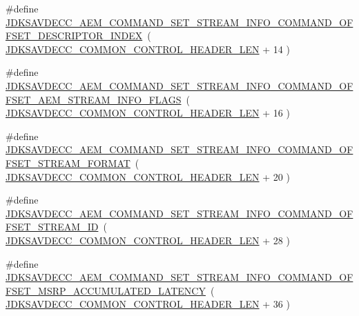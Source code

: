 \begin{DoxyCompactItemize}
\item 
\#define \hyperlink{group__command__set__stream__info_gae2c8f8975d9cf1cb27376158fdd5768f}{J\+D\+K\+S\+A\+V\+D\+E\+C\+C\+\_\+\+A\+E\+M\+\_\+\+C\+O\+M\+M\+A\+N\+D\+\_\+\+S\+E\+T\+\_\+\+S\+T\+R\+E\+A\+M\+\_\+\+I\+N\+F\+O\+\_\+\+C\+O\+M\+M\+A\+N\+D\+\_\+\+O\+F\+F\+S\+E\+T\+\_\+\+D\+E\+S\+C\+R\+I\+P\+T\+O\+R\+\_\+\+I\+N\+D\+EX}~( \hyperlink{group__jdksavdecc__avtp__common__control__header_gaae84052886fb1bb42f3bc5f85b741dff}{J\+D\+K\+S\+A\+V\+D\+E\+C\+C\+\_\+\+C\+O\+M\+M\+O\+N\+\_\+\+C\+O\+N\+T\+R\+O\+L\+\_\+\+H\+E\+A\+D\+E\+R\+\_\+\+L\+EN} + 14 )
\item 
\#define \hyperlink{group__command__set__stream__info_gaef8a0573e8b5fe63b636e92f219d763d}{J\+D\+K\+S\+A\+V\+D\+E\+C\+C\+\_\+\+A\+E\+M\+\_\+\+C\+O\+M\+M\+A\+N\+D\+\_\+\+S\+E\+T\+\_\+\+S\+T\+R\+E\+A\+M\+\_\+\+I\+N\+F\+O\+\_\+\+C\+O\+M\+M\+A\+N\+D\+\_\+\+O\+F\+F\+S\+E\+T\+\_\+\+A\+E\+M\+\_\+\+S\+T\+R\+E\+A\+M\+\_\+\+I\+N\+F\+O\+\_\+\+F\+L\+A\+GS}~( \hyperlink{group__jdksavdecc__avtp__common__control__header_gaae84052886fb1bb42f3bc5f85b741dff}{J\+D\+K\+S\+A\+V\+D\+E\+C\+C\+\_\+\+C\+O\+M\+M\+O\+N\+\_\+\+C\+O\+N\+T\+R\+O\+L\+\_\+\+H\+E\+A\+D\+E\+R\+\_\+\+L\+EN} + 16 )
\item 
\#define \hyperlink{group__command__set__stream__info_gad1e39931a6700da6d1227bcfba9583b1}{J\+D\+K\+S\+A\+V\+D\+E\+C\+C\+\_\+\+A\+E\+M\+\_\+\+C\+O\+M\+M\+A\+N\+D\+\_\+\+S\+E\+T\+\_\+\+S\+T\+R\+E\+A\+M\+\_\+\+I\+N\+F\+O\+\_\+\+C\+O\+M\+M\+A\+N\+D\+\_\+\+O\+F\+F\+S\+E\+T\+\_\+\+S\+T\+R\+E\+A\+M\+\_\+\+F\+O\+R\+M\+AT}~( \hyperlink{group__jdksavdecc__avtp__common__control__header_gaae84052886fb1bb42f3bc5f85b741dff}{J\+D\+K\+S\+A\+V\+D\+E\+C\+C\+\_\+\+C\+O\+M\+M\+O\+N\+\_\+\+C\+O\+N\+T\+R\+O\+L\+\_\+\+H\+E\+A\+D\+E\+R\+\_\+\+L\+EN} + 20 )
\item 
\#define \hyperlink{group__command__set__stream__info_ga25392dac748e3b4de8159c6cd33ecf7a}{J\+D\+K\+S\+A\+V\+D\+E\+C\+C\+\_\+\+A\+E\+M\+\_\+\+C\+O\+M\+M\+A\+N\+D\+\_\+\+S\+E\+T\+\_\+\+S\+T\+R\+E\+A\+M\+\_\+\+I\+N\+F\+O\+\_\+\+C\+O\+M\+M\+A\+N\+D\+\_\+\+O\+F\+F\+S\+E\+T\+\_\+\+S\+T\+R\+E\+A\+M\+\_\+\+ID}~( \hyperlink{group__jdksavdecc__avtp__common__control__header_gaae84052886fb1bb42f3bc5f85b741dff}{J\+D\+K\+S\+A\+V\+D\+E\+C\+C\+\_\+\+C\+O\+M\+M\+O\+N\+\_\+\+C\+O\+N\+T\+R\+O\+L\+\_\+\+H\+E\+A\+D\+E\+R\+\_\+\+L\+EN} + 28 )
\item 
\#define \hyperlink{group__command__set__stream__info_ga6f2760499997fcb1f9e9eb3eaa17dfe5}{J\+D\+K\+S\+A\+V\+D\+E\+C\+C\+\_\+\+A\+E\+M\+\_\+\+C\+O\+M\+M\+A\+N\+D\+\_\+\+S\+E\+T\+\_\+\+S\+T\+R\+E\+A\+M\+\_\+\+I\+N\+F\+O\+\_\+\+C\+O\+M\+M\+A\+N\+D\+\_\+\+O\+F\+F\+S\+E\+T\+\_\+\+M\+S\+R\+P\+\_\+\+A\+C\+C\+U\+M\+U\+L\+A\+T\+E\+D\+\_\+\+L\+A\+T\+E\+N\+CY}~( \hyperlink{group__jdksavdecc__avtp__common__control__header_gaae84052886fb1bb42f3bc5f85b741dff}{J\+D\+K\+S\+A\+V\+D\+E\+C\+C\+\_\+\+C\+O\+M\+M\+O\+N\+\_\+\+C\+O\+N\+T\+R\+O\+L\+\_\+\+H\+E\+A\+D\+E\+R\+\_\+\+L\+EN} + 36 )

\end{DoxyCompactItemize}
